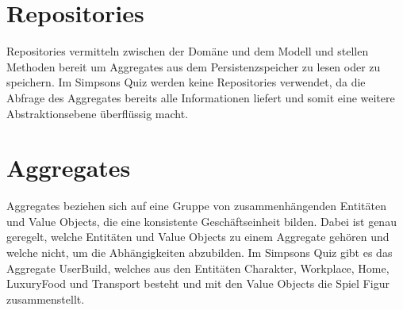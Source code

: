 \section{Repositories}

Repositories vermitteln zwischen der Domäne und dem Modell und stellen Methoden bereit um Aggregates aus dem Persistenzspeicher zu lesen oder zu speichern. Im Simpsons Quiz werden keine Repositories verwendet, da die Abfrage des Aggregates bereits alle Informationen liefert und somit eine weitere Abstraktionsebene überflüssig macht. 

\section{Aggregates}
Aggregates beziehen sich auf eine Gruppe von zusammenhängenden Entitäten und Value Objects, die eine konsistente Geschäftseinheit bilden. Dabei ist genau geregelt, welche Entitäten und Value Objects zu einem Aggregate gehören und welche nicht, um die Abhängigkeiten abzubilden. \newline
Im Simpsons Quiz gibt es das Aggregate UserBuild, welches aus den Entitäten Charakter, Workplace, Home, LuxuryFood und Transport besteht und mit den Value Objects die Spiel Figur zusammenstellt.
